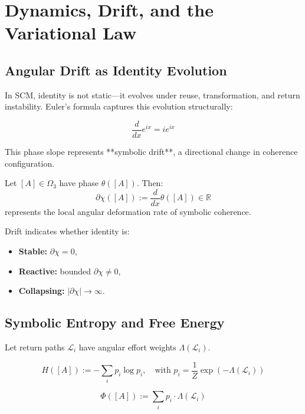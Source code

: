 \chapter{Dynamics, Drift, and the Variational Law} \label{chapter:dynamics-variational}

\section{Angular Drift as Identity Evolution}

In SCM, identity is not static—it evolves under reuse, transformation, and return instability. Euler’s formula captures this evolution structurally:

\begin{equation}
\frac{d}{dx} e^{ix} = i e^{ix}
\end{equation}

This phase slope represents **symbolic drift**, a directional change in coherence configuration.

\begin{definition}
Let $[A] \in \Omega_3$ have phase $\theta([A])$. Then:
\[
\partial \chi([A]) := \frac{d}{dx} \theta([A]) \in \mathbb{R}
\]
represents the local angular deformation rate of symbolic coherence.
\end{definition}

\noindent Drift indicates whether identity is:
\begin{itemize}
    \item \textbf{Stable:} $\partial \chi = 0$,
    \item \textbf{Reactive:} bounded $\partial \chi \neq 0$,
    \item \textbf{Collapsing:} $\left| \partial \chi \right| \to \infty$.
\end{itemize}

\section{Symbolic Entropy and Free Energy}

Let return paths $\mathcal{L}_i$ have angular effort weights $\Lambda(\mathcal{L}_i)$.

\begin{definition}
\[
H([A]) := -\sum_i p_i \log p_i, \quad \text{with } p_i = \frac{1}{Z} \exp(-\Lambda(\mathcal{L}_i))
\]
\end{definition}

\begin{definition}
\[
\Phi([A]) := \sum_i p_i \cdot \Lambda(\mathcal{L}_i)
\]
\end{definition}

